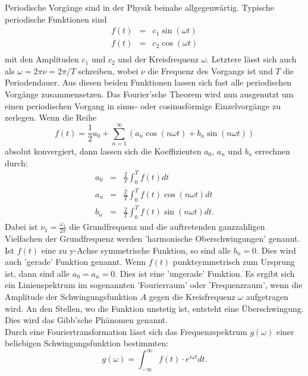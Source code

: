 Periodische Vorgänge sind in der Physik beinahe allgegenwärtig.
Typische periodische Funktionen sind
\begin{align*}
  f(t) &=& c_{1} \sin{(\omega t)}\\
  f(t) &=& c_{2} \cos{(\omega t)}\\
\end{align*}
mit den Amplituden $c_{1}$ und $c_{2}$ und der Kreisfrequenz $\omega$.
Letztere lässt sich auch als $\omega = 2 \pi \nu = 2 \pi /T$ schreiben, wobei $\nu$ die Frequenz des Vorgangs ist und $T$ die Periodendauer.
Aus diesen beiden Funktionen lassen sich fast alle periodischen Vorgänge zusammensetzen.
Das Fourier'sche Theorem wird nun ausgenutzt um einen periodischen Vorgang in sinus- oder cosinusförmige Einzelvorgänge zu zerlegen.
Wenn die Reihe
\begin{equation*}
  f(t)= \frac{1}{2}a_0+\sum_{n=1}^{\infty} \left(a_{n} \cos{(n\omega t)} + b_{n} \sin{(n \omega t)}  \right)
\end{equation*}
absolut konvergiert, dann lassen sich die Koeffizienten $a_{0}$, $a_{n}$ und $b_{n}$ errechnen durch:
\begin{align*}
  a_{0} &=& \frac{2}{T} \int_0^T \! f(t) dt\\
  a_{n} &=& \frac{2}{T} \int_0^T \! f(t) \cos{(n \omega t)} dt\\
  b_{n} &=& \frac{2}{T} \int_0^T \! f(t) \sin{(n \omega t)} dt.
\end{align*}
Dabei ist $\nu_{1}=\frac{\omega_{1}}{2 \pi}$ die Grundfrequenz und die auftretenden ganzzahligen Vielfachen der Grundfrequenz werden 'harmonische Oberschwingungen' genannt.
Ist $f(t)$ eine zu y-Achse symmetrische Funktion, so sind alle $b_{n}=0$.
Dies wird auch 'gerade' Funktion genannt.
Wenn $f(t)$ punktsymmetrisch zum Ursprung ist, dann sind alle $a_{0}=a_{n}=0$.
Dies ist eine 'ungerade' Funktion.
Es ergibt sich ein Linienspektrum im sogenannten 'Fourierraum' oder 'Frequenzraum', wenn die Amplitude der Schwingungsfunktion $A$ gegen die Kreisfrequenz $\omega$ aufgetragen wird.
An den Stellen, wo die Funktion unstetig ist, entsteht eine Überschwingung. Dies wird das Gibb'sche Phänomen genannt.
\\Durch eine Fouriertransformation lässt sich das Frequenzspektrum $g(\omega)$ einer beliebigen Schwingungsfunktion bestimmten:
\begin{equation*}
  g(\omega) = \int_{-\infty}^{\infty} \! f(t) \cdot e^{i \omega t} dt.
\end{equation*}


